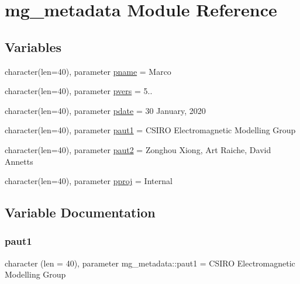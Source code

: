 \hypertarget{namespacemg__metadata}{}\section{mg\+\_\+metadata Module Reference}
\label{namespacemg__metadata}
\subsection*{Variables}
\begin{DoxyCompactItemize}
\item 
character(len=40), parameter \hyperlink{namespacemg__metadata_ad684795e52fbc1cdd49b371b212a9e80}{pname} = \textquotesingle{}Marco\textquotesingle{}
\item 
character(len=40), parameter \hyperlink{namespacemg__metadata_a12335b83f4d2c57e111fad11368698d3}{pvers} = \textquotesingle{}5..\textquotesingle{}
\item 
character(len=40), parameter \hyperlink{namespacemg__metadata_a4106e803f80dc8c6ab3c50695fb54f5d}{pdate} = \textquotesingle{}30 January, 2020\textquotesingle{}
\item 
character(len=40), parameter \hyperlink{namespacemg__metadata_a110dfe842cce52440d80ec88e87c5c17}{paut1} = \textquotesingle{}C\+S\+I\+RO Electromagnetic Modelling Group\textquotesingle{}
\item 
character(len=40), parameter \hyperlink{namespacemg__metadata_a57994bf5e2ca111728f864404d2819bd}{paut2} = \textquotesingle{}Zonghou Xiong, Art Raiche, David Annetts\textquotesingle{}
\item 
character(len=40), parameter \hyperlink{namespacemg__metadata_afefd0fba4ecb62a3ed3c8dcfd479c2d7}{pproj} = \textquotesingle{}Internal\textquotesingle{}
\end{DoxyCompactItemize}


\subsection{Variable Documentation}
\mbox{\label{namespacemg__metadata_a110dfe842cce52440d80ec88e87c5c17}} 
\subsubsection{\texorpdfstring{paut1}{paut1}}
{\footnotesize\ttfamily character (len = 40), parameter mg\+\_\+metadata\+::paut1 = \textquotesingle{}C\+S\+I\+RO Electromagnetic Modelling Group\textquotesingle{}}

